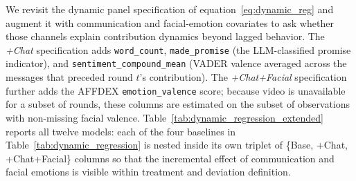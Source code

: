 \documentclass[12pt,letterpaper,english]{article}
\begin{document}
We revisit the dynamic panel specification of equation~\ref{eq:dynamic_reg} and
augment it with communication and facial-emotion covariates to ask whether
those channels explain contribution dynamics beyond lagged behavior. The
\emph{+Chat} specification adds \texttt{word\_count}, \texttt{made\_promise}
(the LLM-classified promise indicator), and \texttt{sentiment\_compound\_mean}
(VADER valence averaged across the messages that preceded round $t$'s
contribution). The \emph{+Chat+Facial} specification further adds the AFFDEX
\texttt{emotion\_valence} score; because video is unavailable for a subset of
rounds, these columns are estimated on the subset of observations with
non-missing facial valence. Table~\ref{tab:dynamic_regression_extended}
reports all twelve models: each of the four baselines in
Table~\ref{tab:dynamic_regression} is nested inside its own triplet of
\{Base, +Chat, +Chat+Facial\} columns so that the incremental effect of
communication and facial emotions is visible within treatment and deviation
definition.

\begin{table}[H]
    \centering \footnotesize
    
    \caption{Dynamic Panel Regression Analysis with Communication and Facial
    Emotions. Columns are grouped into four baselines (IF Treatment mean,
    AF Treatment mean, IF Treatment min/med/max, AF Treatment min/med/max); each
    baseline is reported in three specifications (Base, +Chat, +Chat+Facial).
    Arellano-Bond two-step GMM with Windmeijer-corrected robust standard
    errors in parentheses. Instruments: lags 2--5 of contribution.}
    \label{tab:dynamic_regression_extended}
\end{table}
\end{document}
